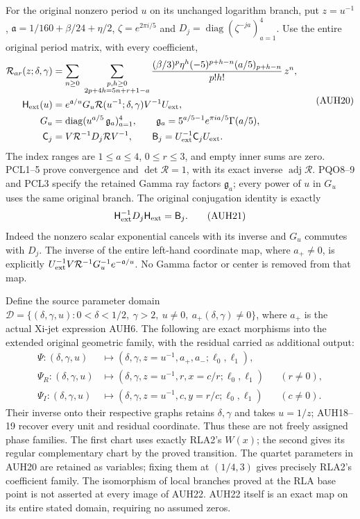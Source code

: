 \documentclass[11pt]{article}
\begin{document}
For the original nonzero period $u$ on its unchanged logarithm branch,
put $z=u^{-1}$, $\mathfrak a=1/160+\beta/24+\eta/2$,
$\zeta=e^{2\pi i/5}$ and
$D_j=\operatorname{diag}(\zeta^{-ja})_{a=1}^4$.
Use the entire original period matrix, with every coefficient,
\[
\begin{aligned}
 \mathcal R_{ar}(z;\delta,\gamma)
 &=\sum_{n\ge0}\ 
 \sum_{\substack{p,h\ge0\\2p+4h=5n+r+1-a}}
 \frac{(\beta/3)^p\eta^h(-5)^{p+h-n}(a/5)_{p+h-n}}{p!h!}\,z^n,\\
 \mathsf H_{\rm ext}(u)&=
 e^{\mathfrak a/u}G_u\mathcal R(u^{-1};\delta,\gamma)V^{-1}U_{\rm ext},\\
 G_u&=\operatorname{diag}(u^{a/5}\,\mathfrak g_a)_{a=1}^4,\qquad
 \mathfrak g_a=5^{a/5-1}e^{\pi ia/5}\Gamma(a/5),\\
 \mathsf C_j&=V\mathcal R^{-1}D_j\mathcal RV^{-1},\qquad
 \mathsf B_j=U_{\rm ext}^{-1}\mathsf C_jU_{\rm ext}.
\end{aligned}\tag{AUH20}
\]
The index ranges are $1\le a\le4$, $0\le r\le3$, and empty
inner sums are zero.  PCL1--5 prove convergence and
$\det\mathcal R=1$, with its exact inverse $\operatorname{adj}\mathcal R$.
PQO8--9 and PCL3 specify the retained Gamma ray factors $\mathfrak g_a$;
every power of $u$ in $G_u$ uses the same original branch.
The original conjugation identity is exactly
\[
 \mathsf H_{\rm ext}^{-1}D_j\mathsf H_{\rm ext}=\mathsf B_j.
 \tag{AUH21}
\]
Indeed the nonzero scalar exponential cancels with its inverse and
$G_u$ commutes with $D_j$.  The inverse of the entire left-hand
coordinate map, where $a_+\ne0$, is explicitly
$U_{\rm ext}^{-1}V\mathcal R^{-1}G_u^{-1}e^{-\mathfrak a/u}$.
No Gamma factor or center is removed from that map.

Define the source parameter domain
$\mathcal D=\{(\delta,\gamma,u):0<\delta<1/2,\ \gamma>2,
\ u\ne0,\ a_+(\delta,\gamma)\ne0\}$,
where $a_+$ is the actual Xi-jet expression AUH6.
The following are exact morphisms into the extended original
geometric family, with the residual carried as additional output:
\[
\begin{aligned}
 \Psi:(\delta,\gamma,u)&\longmapsto
  (\delta,\gamma,z=u^{-1},a_+,a_-;\ell_0,\ell_1),\\
 \Psi_R:(\delta,\gamma,u)&\longmapsto
  (\delta,\gamma,z=u^{-1},r,x=c/r;\ell_0,\ell_1)
                                      &&(r\ne0),\\
 \Psi_I:(\delta,\gamma,u)&\longmapsto
  (\delta,\gamma,z=u^{-1},c,y=r/c;\ell_0,\ell_1)
                                      &&(c\ne0).
\end{aligned}\tag{AUH22}
\]
Their inverse onto their respective graphs retains $\delta,\gamma$
and takes $u=1/z$; AUH18--19 recover every unit and residual
coordinate.  Thus these are not freely assigned phase families.
The first chart uses exactly RLA2's $W(x)$; the second gives its
regular complementary chart by the proved transition.
The quartet parameters in AUH20 are retained as variables; fixing
them at $(1/4,3)$ gives precisely RLA2's coefficient family.
The isomorphism of local branches proved at the RLA base point is
not asserted at every image of AUH22.  AUH22 itself is an exact
map on its entire stated domain, requiring no assumed zeros.
\end{document}
